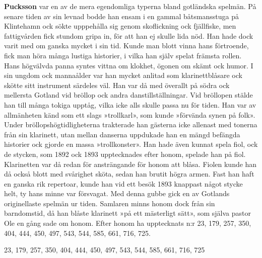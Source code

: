 \textbf{Pucksson} var en av de mera egendomliga typerna bland gotländska spelmän. På senare tiden av sin levnad bodde han ensam i en gammal båtsmansstuga på Klintehamn ock sökte upppehålla sig genom skoflickning ock fjällfiske, men fattigvården fick stundom gripa in, för att han ej skulle lida nöd. Han hade dock varit med om ganska mycket i sin tid. Kunde man blott vinna hans förtroende, fick man höra många lustiga historier, i vilka han själv spelat främsta rollen. Hans högvälvda panna syntes vittna om klokhet, ögonen om skämt ock humor. I sin ungdom ock mannaålder var han mycket anlitad som klarinettblåsare ock skötte sitt instrument särdeles väl. Han var då med överallt på södra ock mellersta Gotland vid bröllop ock andra danstillställningar. Vid bröllopen stälde han till många tokiga upptåg, vilka icke alls skulle passa nu för tiden. Han var av allmänheten känd som ett slags »trollkarl», som kunde »förvända synen på folk». Under bröllopshögtidligheterna trakterade han gästerna icke allenast med tonerna från sin klarinett, utan mellan danserna uppdukade han en mängd befängda historier ock gjorde en massa »trollkonster». Han hade även kunnat spela fiol, ock de stycken, som 1892 ock 1893 upptecknades efter honom, spelade han på fiol. Klarinetten var då redan för ansträngande för honom att blåsa. Fiolen kunde han då också blott med svårighet sköta, sedan han brutit högra armen. Fast han haft en ganska rik repertoar, kunde han vid ett besök 1893 knappast något stycke helt, ty hans minne var försvagat. Med denna gubbe gick en av Gotlands originellaste spelmän ur tiden. Samlaren minns honom dock från sin barndomstid, då han blåste klarinett »på ett mästerligt sätt», som själva pastor Ole en gång sade om honom. Efter honom ha upptecknats n:r 23, 179, 257, 350, 404, 444, 450, 497, 543, 544, 585, 661, 716, 725.

23, 179, 257, 350, 404, 444, 450, 497, 543, 544, 585, 661, 716, 725